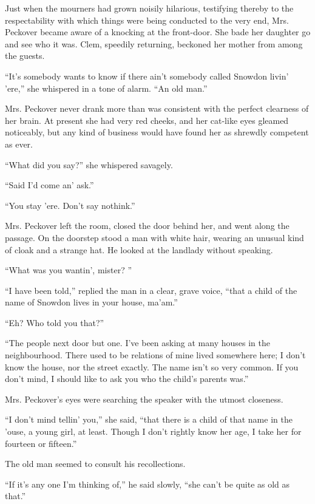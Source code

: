 Just when the mourners had grown noisily hilarious, testifying thereby
to the respectability with which things were being conducted to the very
end, Mrs. Peckover became aware of a knocking at the front-door. She
bade her daughter go and see who it was. Clem, speedily returning,
beckoned her mother from among the guests.

``It's somebody wants to know if there ain't somebody called Snowdon
livin' 'ere,'' she whispered in a tone of alarm. ``An old man.''

Mrs. Peckover never drank more than was consistent with the perfect
clearness of her brain. At present she had very red cheeks, and her
cat-like eyes gleamed noticeably, but any kind of business would have
found her as shrewdly competent as ever.

{\protect\hypertarget{105}{}{}}``What did you say?'' she whispered
savagely.

``Said I'd come an' ask.''

``You stay 'ere. Don't say nothink.''

Mrs. Peckover left the room, closed the door behind her, and went along
the passage. On the doorstep stood a man with white hair, wearing an
unusual kind of cloak and a strange hat. He looked at the landlady
without speaking.

``What was you wantin', mister? ''

``I have been told,'' replied the man in a clear, grave voice, ``that a
child of the name of Snowdon lives in your house, ma'am.''

``Eh? Who told you that?''

``The people next door but one. I've been asking at many houses in the
neighbourhood. There used to be relations of mine lived somewhere here;
I don't know the house, nor the street exactly. The name isn't so very
common. If you don't mind, I should like to ask you who the child's
parents was.''

Mrs. Peckover's eyes were searching the speaker with the utmost
closeness.

{\protect\hypertarget{106}{}{}}``I don't mind tellin' you,'' she said,
``that there is a child of that name in the 'ouse, a young girl, at
least. Though I don't rightly know her age, I take her for fourteen or
fifteen.''

The old man seemed to consult his recollections.

``If it's any one I'm thinking of,'' he said slowly, ``she can't be
quite as old as that.''


